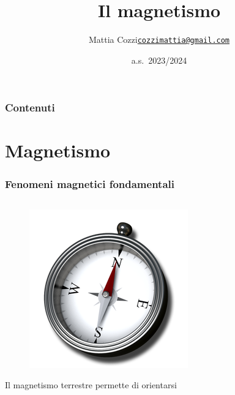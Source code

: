\documentclass[]{beamer}
\title{Il magnetismo}
\author{\texorpdfstring{Mattia Cozzi\newline\href{mailto:cozzimattia@gmail.com}{\texttt{cozzimattia@gmail.com}}}{Mattia Cozzi}}
\date{a.s.~2023/2024}
\theoremstyle{plain}
\begin{document}
\begin{frame}
  \titlepage
\end{frame}





\begin{frame}
\frametitle{Contenuti}
\tableofcontents
\end{frame}

\section{Magnetismo}

\begin{frame}
\frametitle{Fenomeni magnetici fondamentali}
\begin{columns}
\begin{column}{0.3\textwidth}
\begin{figure}
\includegraphics[width=\columnwidth]{img/bussola.png}
\end{figure}
Il magnetismo terrestre permette di orientarsi\\~
\end{column}
\begin{column}{0.3\textwidth}
\end{column}
\begin{column}{0.3\textwidth}
\end{column}
\end{columns}
\end{frame}
\end{document}
